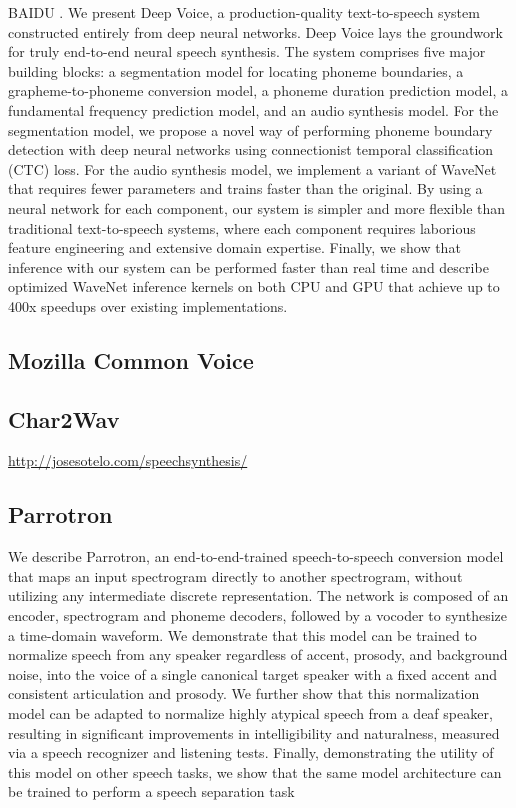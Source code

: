 BAIDU \cite{Arik2017DeepVR}.
We present Deep Voice, a production-quality text-to-speech system constructed entirely from deep neural networks. Deep Voice lays the groundwork for truly end-to-end neural speech synthesis. The system comprises five major building blocks: a segmentation model for locating phoneme boundaries, a grapheme-to-phoneme conversion model, a phoneme duration prediction model, a fundamental frequency prediction model, and an audio synthesis model. For the segmentation model, we propose a novel way of performing phoneme boundary detection with deep neural networks using connectionist temporal classification (CTC) loss. For the audio synthesis model, we implement a variant of WaveNet that requires fewer parameters and trains faster than the original. By using a neural network for each component, our system is simpler and more flexible than traditional text-to-speech systems, where each component requires laborious feature engineering and extensive domain expertise. Finally, we show that inference with our system can be performed faster than real time and describe optimized WaveNet inference kernels on both CPU and GPU that achieve up to 400x speedups over existing implementations. 

\subsection{Mozilla Common Voice}

\subsection{Char2Wav}
\url{http://josesotelo.com/speechsynthesis/}

\subsection{Parrotron}
\cite{biadsy2019parrotron}
We describe Parrotron, an end-to-end-trained speech-to-speech conversion model that maps an input spectrogram directly to another spectrogram, without utilizing any intermediate discrete representation. The network is composed of an encoder, spectrogram and phoneme decoders, followed by a vocoder to synthesize a time-domain waveform. We demonstrate that this model can be trained to normalize speech from any speaker regardless of accent, prosody, and background noise, into the voice of a single canonical target speaker with a fixed accent and consistent articulation and prosody. We further show that this normalization model can be adapted to normalize highly atypical speech from a deaf speaker, resulting in significant improvements in intelligibility and naturalness, measured via a speech recognizer and listening tests. Finally, demonstrating the utility of this model on other speech tasks, we show that the same model architecture can be trained to perform a speech separation task 



